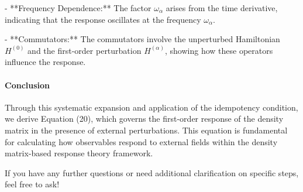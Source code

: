 - **Frequency Dependence:** The factor \( \omega_{\alpha} \) arises from the time derivative, indicating that the response oscillates at the frequency \( \omega_{\alpha} \).

- **Commutators:** The commutators involve the unperturbed Hamiltonian \( H^{(0)} \) and the first-order perturbation \( H^{(\alpha)} \), showing how these operators influence the response.

\paragraph{Conclusion}

Through this systematic expansion and application of the idempotency condition, we derive Equation (20), which governs the first-order response of the density matrix in the presence of external perturbations. This equation is fundamental for calculating how observables respond to external fields within the density matrix-based response theory framework.

If you have any further questions or need additional clarification on specific steps, feel free to ask!


